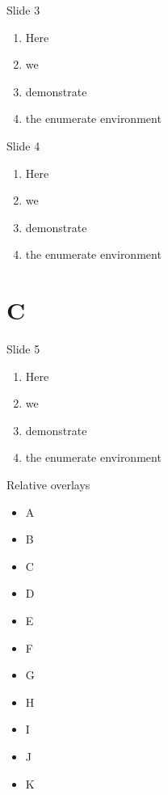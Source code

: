 \documentclass[a4paper,style=fyma]{powerdot}
\begin{document}
\begin{slide}{Slide 3}
  \begin{enumerate}[type=1]
    \item<1-> Here
      \item<2-> we
        \item<3-> demonstrate
          \item<4-> the enumerate environment
  \end{enumerate}
\end{slide}

\begin{slide}{Slide 4}
  \begin{enumerate}[type=1]
    \item<1> Here
      \item<2> we
        \item<3> demonstrate
          \item<4> the enumerate environment
  \end{enumerate}
\end{slide}

\section{C}

\begin{slide}{Slide 5}
  \begin{enumerate}[type=0]
    \item<1> Here
      \item<2> we
        \item<3> demonstrate
          \item<4> the enumerate environment
  \end{enumerate}
\end{slide}

\begin{slide}{Relative overlays}
   \begin{itemize}
     \item A \pause
     \item B \pause
     \item C 
     \pause
     \item D 
     \pause
     \item E \pause
     \item F \pause
     \item G \pause
     \item H \pause
     \item I \pause
     \item J \pause
     \item K
   \end{itemize}
 \end{slide}
\end{document}
